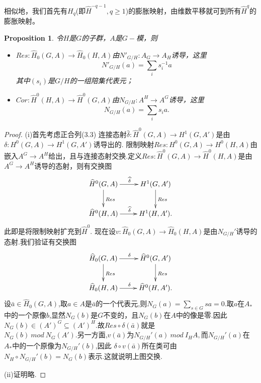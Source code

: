 \documentclass[UTF8]{article}
\newtheorem{prop}{Proposition}[section]
\begin{document}
相似地，我们首先有$H_{q}$(即$\widehat{H}^{-q-1},q\geq 1$)的膨胀映射，由维数平移就可到所有$\widehat{H}^{q}$的膨胀映射。
\begin{prop}
	令$H$是$G$的子群，$A$是$G-$模，则
	\begin{itemize}
		\item[(1)] $Res:\widehat{H}_{0}(G,A)\rightarrow \widehat{H}_{0}(H,A)$由$N'_{G/H}:A_{G}\rightarrow A_{H}$诱导，这里
		$$
		N'_{G/H}(a)=\sum_{i}s_{i}^{-1}a
		$$
		其中$(s_{i})$是$G/H$的一组陪集代表元；
	\item[(2)] $Cor:\widehat{H}^{0}(H,A)\rightarrow \widehat{H}^{0}(G,A)$由$N_{G/H}:A^{H}\rightarrow A^{G}$诱导，这里$$
	N_{G/H}(a)=\sum_{i}s_{i}a.
	$$
	\end{itemize}
\end{prop}
\begin{proof}
	(i)首先考虑正合列(3.3) 连接态射$\widehat{\delta}:\widehat{H}^{0}(G,A)\rightarrow H^{1}(G,A')$是由$\delta:H^{0}(G,A)\rightarrow H^{1}(G,A')$诱导出的.
	限制映射$Res:H^{0}(G,A)\rightarrow H^{0}(H,A)$由嵌入$A^{G}\rightarrow A^{H}$给出，且与连接态射交换.定义$Res:\widehat{H}^{0}(G,A)\rightarrow\widehat{H}^{0}(H,A)$是由$A^{G}\rightarrow A^{H}$诱导的态射，则有交换图
	$$
	\xymatrix{
\widehat{H}^{0}(G,A)\ar[r]^{\widehat{\delta}}\ar[d]^{Res}&H^{1}(G,A')\ar[d]^{Res}\\
	\widehat{H}^{0}(H,A)\ar[r]^{\widehat{\delta}}&H^{1}(H,A').
}
	$$
	此即是将限制映射扩充到$\widehat{H}^{0}$.
	现在设$v:\widehat{H}_{0}(G,A)\rightarrow \widehat{H}_{0}(H,A)$是由$N_{G/H}'$诱导的态射.我们验证有交换图
	$$
	\xymatrix{
		\widehat{H}_{0}(G,A)\ar[r]^{\delta}\ar[d]^{Res}&\widehat{H}^{0}(G,A')\ar[d]^{Res}\\
		\widehat{H}_{0}(H,A)\ar[r]^{\delta}&\widehat{H}^{0}(H,A').
	}
	$$
	设$\bar{a}\in\widehat{H}_{0}(G,A)$,取$a\in A$是$\bar{a}$的一个代表元,则$N_{G}(a)=\sum_{s\in G}sa=0$.取$a$在$A_{*}$中的一个原像$b$,显然$N_{G}(b)$是$G$不变的，且$N_{G}(b)$在$A$中的像是零.因此$N_{G}(b)\in (A')^{G}\subseteq (A')^{H}$.故$Res\circ \delta(\bar{a})$就是\\
	$N_{G}(b) \ mod \ N_{G}(A').$另一方面,$v(\bar{a})$为$N_{G/H}'(a)\ mod \ I_{H}A,$而$N_{G/H}'(a)$在$A_{*}$中的一个原像为$N_{G/H}'(b)$,因此
	$\delta\circ v(\bar{a})$所在类可由$N_{H}\circ N_{G/H}'(b)=N_{G}(b)$表示.这就说明上图交换.
	
	(ii)证明略.
	
\end{proof}
\end{document}
